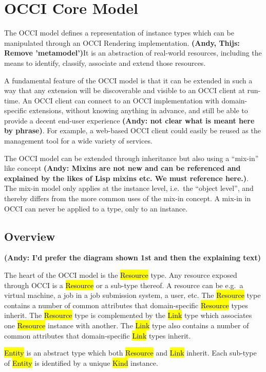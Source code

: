 \documentclass[10pt,a4paper]{article}
\begin{document}
\section{OCCI Core Model}
The OCCI model defines a representation of instance types which can be
manipulated through an OCCI Rendering implementation. 
\textbf{(Andy, Thijs: Remove 'metamodel')}It is an abstraction of real-world 
resources, including the means to identify, classify, associate 
and extend those resources. 

A fundamental feature of the OCCI model is that it can be extended in such a
way that any extension will be discoverable and visible to an OCCI client at
run-time. An OCCI client can connect to an OCCI implementation with
domain-specific extensions, without knowing anything in advance, and still be
able to provide a decent end-user experience \textbf{(Andy: not clear what is meant here by phrase)}. 
For example, a web-based OCCI
client could easily be reused as the management tool for a wide variety of
services.

The OCCI model can be extended through inheritance but also
using a ``mix-in'' like concept \textbf{(Andy: Mixins are not new and can be referenced and explained
by the likes of Lisp mixins etc. We must reference here.)}. The mix-in model only applies at the instance
level, i.e.~the ``object level'', and thereby differs from the more common uses
of the mix-in concept. A mix-in in OCCI can never be applied to a type, only to
an instance.

\subsection{Overview}

\textbf{(Andy: I'd prefer the diagram shown 1st and then the explaining text)}

The heart of the OCCI model is the \hl{Resource} type. Any resource exposed
through OCCI is a \hl{Resource} or a sub-type thereof.
A resource can be e.g.~a virtual machine, a job in a job submission system, a
user, etc.
%
The \hl{Resource} type contains a number of common attributes that
domain-specific \hl{Resource} types inherit. The \hl{Resource} type is
complemented by the \hl{Link} type which associates one \hl{Resource} instance
with another.
%
The \hl{Link} type also contains a number of common attributes that
domain-specific \hl{Link} types inherit.

\hl{Entity} is an abstract type which both \hl{Resource} and \hl{Link} inherit.
Each sub-type of \hl{Entity} is identified by a unique \hl{Kind} instance.
%
\end{document}
